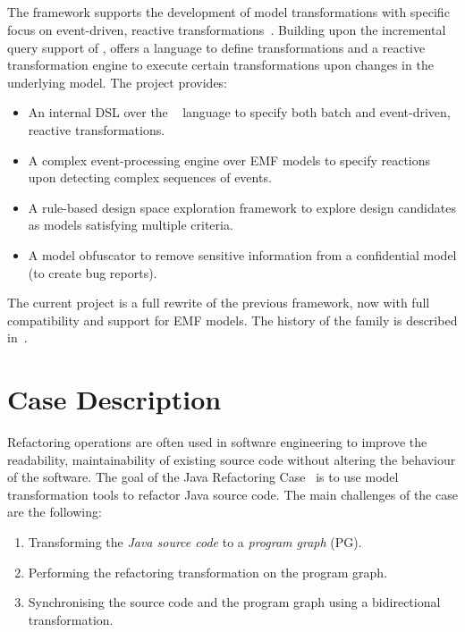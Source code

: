 \documentclass[submission,copyright,creativecommons]{eptcs}
\begin{document}
\subsection{\viatra}

The \viatra framework supports the development of model transformations with specific focus on event-driven, reactive transformations~\cite{viatra}. Building upon the incremental query support of \eiq, \viatra offers a language to define transformations and a reactive transformation engine to execute certain transformations upon changes in the underlying model. The \viatra project provides:

\begin{itemize}[noitemsep]
	\item An internal DSL over the \xtend~\cite{Xtend} language to specify both batch and event-driven, reactive transformations.
	\item A complex event-processing engine over EMF models to specify reactions upon detecting complex sequences of events.
	\item A rule-based design space exploration framework to explore design candidates as models satisfying multiple criteria.
	\item A model obfuscator to remove sensitive information from a confidential model (\eg to create bug reports).
\end{itemize}

The current \viatra{} project is a full rewrite of the previous \viatratwo{} framework, now with full compatibility and support for EMF models. The history of the \viatra{} family is described in~\cite{viatra-history}.

\section{Case Description}

Refactoring operations are often used in software engineering to improve the readability, maintainability of existing source code without altering the behaviour of the software. The goal of the Java Refactoring Case~\cite{ttc-refactoring-case} is to use model transformation tools to refactor Java source code. The main challenges of the case are the following:

\begin{enumerate}[noitemsep]
\item Transforming the \emph{Java source code} to a \emph{program graph} (PG).
\item Performing the refactoring transformation on the program graph.
\item Synchronising the source code and the program graph using a bidirectional transformation.
\end{enumerate}
\end{document}
